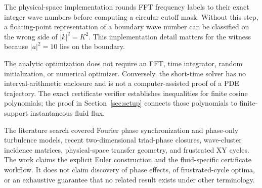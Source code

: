 \documentclass[11pt]{article}
\begin{document}
The physical-space implementation rounds FFT frequency labels to their exact integer wave numbers before computing a circular cutoff mask. Without this step, a floating-point representation of a boundary wave number can be classified on the wrong side of $|k|^2=K^2$. This implementation detail matters for the witness because $|a|^2=10$ lies on the boundary.

The analytic optimization does not require an FFT, time integrator, random initialization, or numerical optimizer. Conversely, the short-time solver has no interval-arithmetic enclosure and is not a computer-assisted proof of a PDE trajectory. The exact certificate verifier establishes inequalities for finite cosine polynomials; the proof in Section~\ref{sec:setup} connects those polynomials to finite-support instantaneous fluid flux.

The literature search covered Fourier phase synchronization and phase-only turbulence models, recent two-dimensional triad-phase closures, wave-cluster incidence matrices, physical-space transfer geometry, and frustrated XY cycles. The work claims the explicit Euler construction and the fluid-specific certificate workflow. It does not claim discovery of phase effects, of frustrated-cycle optima, or an exhaustive guarantee that no related result exists under other terminology.
\end{document}
